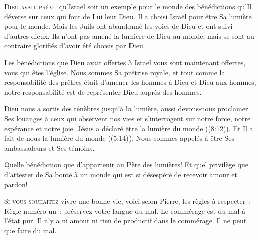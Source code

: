 
\lettrine{D}{ieu avait prévu} qu'Israël soit un exemple pour le monde
 des bénédictions qu'Il déverse sur ceux qui font de Lui leur Dieu.
 Il a choisi Israël pour être Sa lumière pour le monde.
 Mais les Juifs ont abandonné les voies de Dieu et ont suivi d'autres dieux.
 Ils n'ont pas amené la lumière de Dieu au monde, mais se sont au contraire
 glorifiés d'avoir été choisis par Dieu.

Les bénédictions que Dieu avait offertes à Israël vous sont maintenant offertes,
 vous qui êtes l'église. 
 Nous sommes Sa prêtrise royale, et tout comme la responsabilité des prêtres
 était d'amener les hommes à Dieu et Dieu aux hommes,
 notre responsabilité est de représenter Dieu auprès des hommes.


Dieu nous a sortis des ténèbres jusqu'à la lumière, aussi devons-nous proclamer
 Ses louanges à ceux qui observent nos vies et s'interrogent sur notre force,
 notre espérance et notre joie. Jésus a déclaré être
 \og la lumière du monde \fg{} ((8:12)).
 Et Il a fait de nous \og la lumière du monde \fg{} ((5:14)).
 Nous sommes appelés à être Ses ambassadeurs et Ses témoins.

Quelle bénédiction que d'appartenir au Père des lumières!
 Et quel privilège que d'attester de Sa bonté à un monde qui est si désespéré
 de recevoir amour et pardon! 

\dvrule






\lettrine{S}{i vous souhaitez} vivre une bonne vie,
 voici selon Pierre, les règles à respecter~: \\[1ex]
Règle numéro un~: préservez votre langue du mal.
 Le commérage est du mal à l'état pur. Il n'y a ni amour ni rien de productif
 dans le commérage. Il ne peut que faire du mal.

